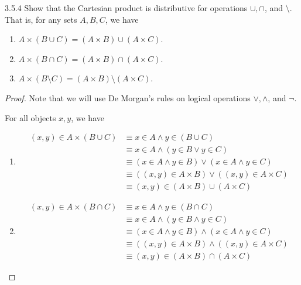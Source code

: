 \begin{exercise}{3.5.4}
	Show that the Cartesian product is distributive for operations $\cup,\cap$, and $\setminus$. That is, for any sets $A,B,C$, we have
	\begin{enumerate}
		\item $A \times (B \cup C) = (A \times B) \cup (A \times C)$.
		\item $A \times (B \cap C) = (A \times B) \cap(A \times C)$.
		\item $A \times (B \setminus C) = (A \times B) \setminus (A \times C)$.
	\end{enumerate}
\end{exercise}
\begin{proof}\leavevmode
	Note that we will use De Morgan's rules on logical operations $\vee, \wedge$, and $\neg$.
	
	For all objects $x,y$, we have
	\begin{enumerate}
		\item 
		\begin{align*}
			(x,y) \in A \times (B \cup C) 
			&\equiv x \in A \wedge y \in (B \cup C) \\
			&\equiv x \in A \wedge (y \in B \vee y \in C) \\
			&\equiv (x \in A \wedge y \in B) \vee (x \in A \wedge y \in C) \\
			&\equiv ((x,y) \in A \times B) \vee ((x,y) \in A \times C) \\
			&\equiv (x,y) \in (A \times B) \cup (A \times C)
		\end{align*}
	
		\item 
		\begin{align*}
			(x,y) \in A \times (B \cap C) 
			&\equiv x \in A \wedge y \in (B \cap C) \\
			&\equiv x \in A \wedge (y \in B \wedge y \in C) \\
			&\equiv (x \in A \wedge y \in B) \wedge (x \in A \wedge y \in C) \\
			&\equiv ((x,y) \in A \times B) \wedge ((x,y) \in A \times C) \\
			&\equiv (x,y) \in (A \times B) \cap (A \times C)
		\end{align*}
	

\end{enumerate}
\end{proof}
